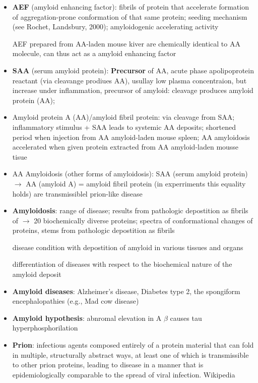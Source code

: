 \documentclass[fleqn]{article}\usepackage{caption}
\begin{document}
\begin{itemize}
\item \textbf{AEF} (amyloid enhancing factor): fibrils of protein that accelerate formation of aggregation-prone conformation of that same protein; seeding mechanism (see Rochet, Landsbury, 2000); amyloidogenic accelerating activity

AEF prepared from AA-laden mouse kiver are chemically identical to AA molecule, can thus act as a amyloid enhancing factor

\item \textbf{SAA} (serum amyloid protein): \textbf{Precursor}  of AA, acute phase apolipoprotein reactant (via cleavange prodiues AA), usullay low plasma concentraion, but increase under inflammation, precursor of amyloid: cleavage produces amyloid protein (AA);  %

\item Amyloid protein A (AA)/amyloid fibril protein: via cleavage from SAA; inflammatory stimulus + SAA leads to systemic AA deposits; shortened period when injection from AA amyloid-laden mouse spleen; AA amyloidosis accelerated when given protein extracted from AA amyloid-laden mousse tisue %
\item AA Amyloidosis (other forms of amyloidosis):  SAA (serum amyloid protein) $\rightarrow$ AA (amyloid A) = amyloid fibril protein (in experriments this equality holds) %
are transmissiblel prion-like disease


\item \textbf{Amyloidosis}: range of disease; results from pathologic depostition as fibrils of $\rightarrow$ 20 biochemically diverse proteins; spectra of conformational changes of proteins, stems from pathologic depostition as fibrils %

disease condition with depostition of amyloid in various tissues and organs %

 
differentiation of diseases with respect to the biochemical nature of the amyloid deposit %



\item \textbf{Amyloid diseases}: Alzheimer's disease, Diabetes type 2, the spongiform encephalopathies (e.g., Mad cow disease) %

 \item \textbf{Amyloid hypothesis}: abnromal elevation in A $\beta$ causes tau hyperphosphorilation

\item \textbf{Prion}: infectious agents composed entirely of a protein material that can fold in multiple, structurally abstract ways, at least one of which is transmissible to other prion proteins, leading to disease in a manner that is epidemiologically comparable to the spread of viral infection. Wikipedia


\end{itemize}
\end{document}
